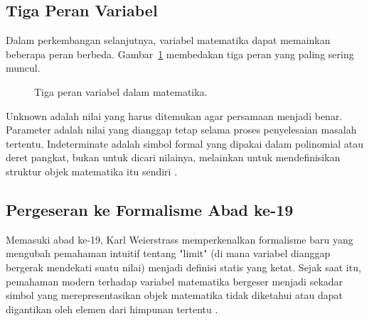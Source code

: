 \documentclass[11pt,a4paper]{article}
\begin{document}
\subsection{Tiga Peran Variabel}

Dalam perkembangan selanjutnya, variabel matematika dapat memainkan beberapa peran berbeda. Gambar~\ref{fig:roles-math} membedakan tiga peran yang paling sering muncul.

\begin{figure}[H]
	\centering
	\caption{Tiga peran variabel dalam matematika.}
	\label{fig:roles-math}
\end{figure}

Unknown adalah nilai yang harus ditemukan agar persamaan menjadi benar. Parameter adalah nilai yang dianggap tetap selama proses penyelesaian masalah tertentu. Indeterminate adalah simbol formal yang dipakai dalam polinomial atau deret pangkat, bukan untuk dicari nilainya, melainkan untuk mendefinisikan struktur objek matematika itu sendiri \cite{wikipedia_math}.

\subsection{Pergeseran ke Formalisme Abad ke-19}

Memasuki abad ke-19, Karl Weierstrass memperkenalkan formalisme baru yang mengubah pemahaman intuitif tentang "limit" (di mana variabel dianggap bergerak mendekati suatu nilai) menjadi definisi statis yang ketat. Sejak saat itu, pemahaman modern terhadap variabel matematika bergeser menjadi sekadar simbol yang merepresentasikan objek matematika tidak diketahui atau dapat digantikan oleh elemen dari himpunan tertentu \cite{wikipedia_math}.
\end{document}
